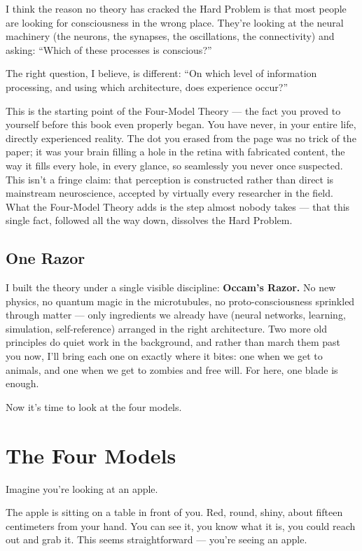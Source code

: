 \documentclass[11pt, twoside, openright]{book}
\begin{document}
I think the reason no theory has cracked the Hard Problem is that most people are looking for consciousness in the wrong place. They're looking at the neural machinery (the neurons, the synapses, the oscillations, the connectivity) and asking: ``Which of these processes is conscious?''

The right question, I believe, is different: ``On which level of information processing, and using which architecture, does experience occur?''

This is the starting point of the Four-Model Theory --- the fact you proved to yourself before this book even properly began. You have never, in your entire life, directly experienced reality. The dot you erased from the page was no trick of the paper; it was your brain filling a hole in the retina with fabricated content, the way it fills every hole, in every glance, so seamlessly you never once suspected. This isn't a fringe claim: that perception is constructed rather than direct is mainstream neuroscience, accepted by virtually every researcher in the field. What the Four-Model Theory adds is the step almost nobody takes --- that this single fact, followed all the way down, dissolves the Hard Problem.

\section*{One Razor}

I built the theory under a single visible discipline: \textbf{Occam's Razor.} No new physics, no quantum magic in the microtubules, no proto-consciousness sprinkled through matter --- only ingredients we already have (neural networks, learning, simulation, self-reference) arranged in the right architecture. Two more old principles do quiet work in the background, and rather than march them past you now, I'll bring each one on exactly where it bites: one when we get to animals, and one when we get to zombies and free will. For here, one blade is enough.

Now it's time to look at the four models.


\chapter{The Four Models}

Imagine you're looking at an apple.

The apple is sitting on a table in front of you. Red, round, shiny, about fifteen centimeters from your hand. You can see it, you know what it is, you could reach out and grab it. This seems straightforward --- you're seeing an apple.
\end{document}
